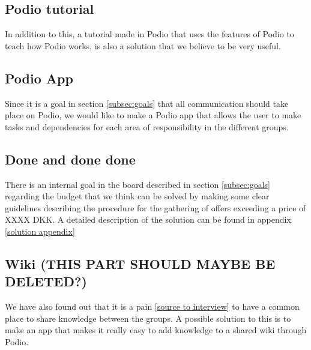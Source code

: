 \subsection{Podio tutorial}
In addition to this, a tutorial made in Podio that uses the features of Podio to
teach how Podio works, is also a solution that we believe to be very useful.

\subsection{Podio App}
Since it is a goal in section \ref{subsec:goals} that all communication should take place
on Podio, we would like to make a Podio app that allows the user to make tasks
and dependencies for each area of responsibility in the different groups.

\subsection{Done and done done}
There is an internal goal in the board described in section \ref{subsec:goals} regarding the
budget that we think can be solved by making some clear guidelines describing
the procedure for the gathering of offers exceeding a price of XXXX DKK. A
detailed description of the solution can be found in appendix \ref{solution
appendix}

\subsection{Wiki (THIS PART SHOULD MAYBE BE DELETED?)}
We have also found out that it is a pain \ref{source to interview} to have a
common place to share knowledge between the groups. A possible solution to this
is to make an app that makes it really easy to add knowledge to a shared wiki
through Podio.

